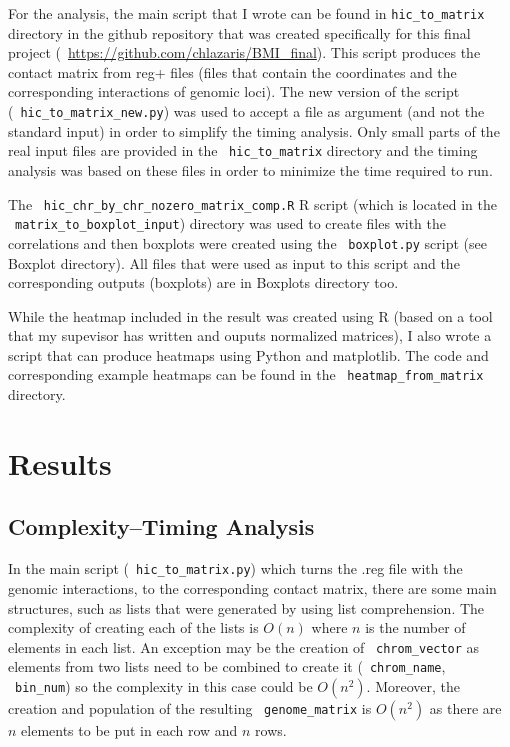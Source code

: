 \documentclass[a4paper, 11pt]{article} %
\begin{document}
For the analysis, the main script that I wrote can be found in
\verb|hic_to_matrix| directory in the github repository that was
created specifically for this final project (~\url{https://github.com/chlazaris/BMI_final}). This script produces the contact matrix
from reg+ files (files that contain the coordinates and the 
corresponding interactions of genomic loci). The new version
of the script (~\verb|hic_to_matrix_new.py|) was used to accept
a file as argument (and not the standard input) in order to
simplify the timing analysis. Only small parts of the real 
input files are provided in the ~\verb|hic_to_matrix| directory
and the timing analysis was based on these files in order
to minimize the time required to run.

The ~\verb|hic_chr_by_chr_nozero_matrix_comp.R| R script (which
is located in the ~\verb|matrix_to_boxplot_input|) directory 
was used to create files with the correlations and then boxplots
were created using the ~\verb|boxplot.py| script (see Boxplot
directory). All files that were used as input to this script 
and the corresponding outputs (boxplots) are in Boxplots directory
too.

While the heatmap included in the result was created using R (based
on a tool that my supevisor has written and ouputs normalized matrices),
I also wrote a script that can produce heatmaps using Python and matplotlib. The code and corresponding example heatmaps can be found in
the ~\verb|heatmap_from_matrix| directory. 
\label{sec:methods}




\section*{Results}

\subsection*{Complexity--Timing Analysis}

In the main script (~\verb|hic_to_matrix.py|) which turns
the .reg file with the genomic interactions, to the corresponding
contact matrix, there are some main structures, such as lists
that were generated by using list comprehension. The complexity
of creating each of the lists is $O(n)$ where $n$ is the number of 
elements in each list. An exception may be the creation of ~\verb|chrom_vector|
as elements from two lists need to be combined to create it (~\verb|chrom_name|, ~\verb|bin_num|) so the complexity in this case could be $O(n^2)$. Moreover,
the creation and population of the resulting ~\verb|genome_matrix| is $O(n^2)$
as there are $n$ elements to be put in each row and $n$ rows.
\end{document}
